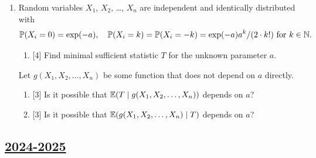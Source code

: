 \begin{enumerate}
\item Random variables $X_1$, $X_2$, \dots, $X_n$ are independent and identically distributed with 
\[
\operatorname{\mathbb{P}}(X_i = 0) = \exp(-a), \quad \operatorname{\mathbb{P}}(X_i = k) = \operatorname{\mathbb{P}}(X_i = -k) = \exp(-a)a^k / (2\cdot k!) \text{ for } k\in \mathbb{N}.
\]
\begin{enumerate}
    \item {[4]} Find minimal sufficient statistic $T$ for the unknown parameter $a$.
\end{enumerate}
Let $g(X_1, X_2, \dots, X_n)$ be some function that does not depend on $a$ directly. 
\begin{enumerate}[resume]
    \item {[3]} Is it possible that $\operatorname{\mathbb{E}}(T \mid g(X_1, X_2, \dots, X_n))$ depends on $a$?
    \item {[3]} Is it possible that $\operatorname{\mathbb{E}}(g(X_1, X_2, \dots, X_n) \mid T)$ depends on $a$?
\end{enumerate}

\end{enumerate}



\subsection[2024-2025]{\hyperref[sec:sol_kr_04_2024_2025]{2024-2025}}
\label{sec:kr_04_2024_2025} %


